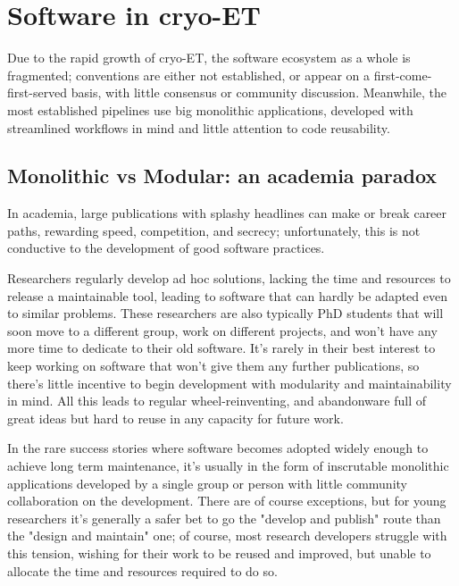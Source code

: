 \chapter{Software in cryo-ET}\label{software}

Due to the rapid growth of cryo-ET, the software ecosystem as a whole is fragmented; conventions are either not established, or appear on a first-come-first-served basis, with little consensus or community discussion.
Meanwhile, the most established pipelines use big monolithic applications, developed with streamlined workflows in mind and little attention to code reusability.

\localtableofcontents

\section{Monolithic vs Modular: an academia paradox}

In academia, large publications with splashy headlines can make or break career paths, rewarding speed, competition, and secrecy; unfortunately, this is not conductive to the development of good software practices.

Researchers regularly develop ad hoc solutions, lacking the time and resources to release a maintainable tool, leading to software that can hardly be adapted even to similar problems.
These researchers are also typically PhD students that will soon move to a different group, work on different projects, and won't have any more time to dedicate to their old software.
It's rarely in their best interest to keep working on software that won't give them any further publications, so there's little incentive to begin development with modularity and maintainability in mind. 
All this leads to regular wheel-reinventing, and abandonware full of great ideas but hard to reuse in any capacity for future work.

In the rare success stories where software becomes adopted widely enough to achieve long term maintenance, it's usually in the form of inscrutable monolithic applications developed by a single group or person with little community collaboration on the development.
There are of course exceptions, but for young researchers it's generally a safer bet to go the "develop and publish" route than the "design and maintain" one; of course, most research developers struggle with this tension, wishing for their work to be reused and improved, but unable to allocate the time and resources required to do so.

